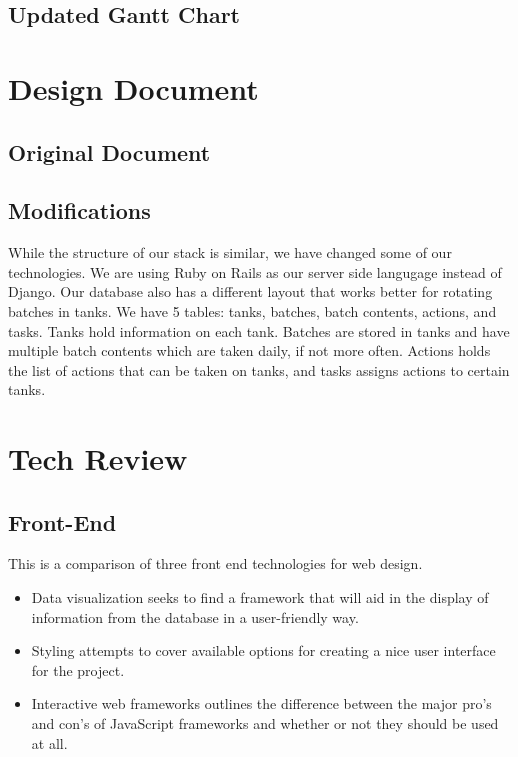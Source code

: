 \documentclass[draftclsnofoot,onecolumn,letterpaper,10pt]{IEEEtran}
\begin{document}
	\subsection{Updated Gantt Chart}
	
\section{Design Document}
	\subsection{Original Document}
	
	\subsection{Modifications}
	While the structure of our stack is similar, we have changed some of our technologies.
	We are using Ruby on Rails as our server side langugage instead of Django.
	Our database also has a different layout that works better for rotating batches in tanks.
	We have 5 tables: tanks, batches, batch contents, actions, and tasks.
	Tanks hold information on each tank.
	Batches are stored in tanks and have multiple batch contents which are taken daily, if not more often.
	Actions holds the list of actions that can be taken on tanks, and tasks assigns actions to certain tanks.

\section{Tech Review}
\subsection{Front-End}
This is a comparison of three front end technologies for web design.
\begin{itemize}
	\item Data visualization seeks to find a framework that will aid in the display of information from the database in a user-friendly way.
	\item Styling attempts to cover available options for creating a nice user interface for the project.
	\item Interactive web frameworks outlines the difference between the major pro's and con's of JavaScript frameworks and whether or not they should be used at all.
\end{itemize}
\end{document}
